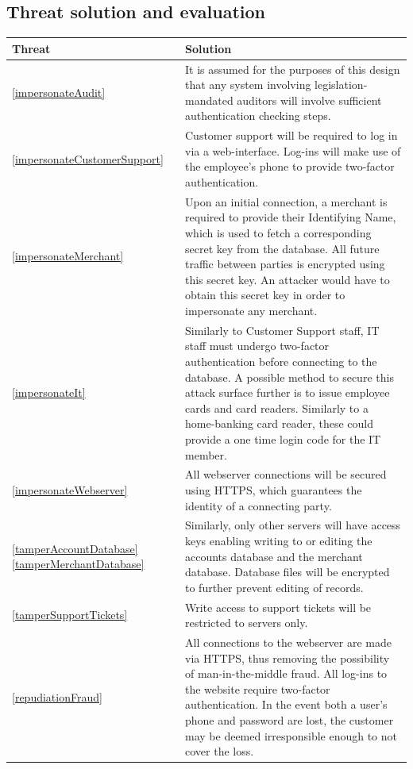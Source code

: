 \subsection{Threat solution and evaluation}

\begin{longtable}{|| p{} | p{} ||}
    \hline
    Threat & Solution \\
    \hline\hline

              \ref{impersonateAudit} & 
        It is assumed for the purposes of this design that any system involving legislation-mandated auditors will involve sufficient authentication checking steps.
    \\ \hline \ref{impersonateCustomerSupport} & 
        Customer support will be required to log in via a web-interface. Log-ins will make use of the employee's phone to provide two-factor authentication.
    \\ \hline \ref{impersonateMerchant} &
        Upon an initial connection, a merchant is required to provide their Identifying Name, which is used to fetch a corresponding secret key from the database. All future traffic between parties is encrypted using this secret key. An attacker would have to obtain this secret key in order to impersonate any merchant.
    \\ \hline \ref{impersonateIt} &
        Similarly to Customer Support staff, IT staff must undergo two-factor authentication before connecting to the database. A possible method to secure this attack surface further is to issue employee cards and card readers. Similarly to a home-banking card reader, these could provide a one time login code for the IT member.
    \\ \hline \ref{impersonateWebserver} &
        All webserver connections will be secured using HTTPS, which guarantees the identity of a connecting party.
    \\ \hline \ref{tamperAccountDatabase} \ref{tamperMerchantDatabase} &
        Similarly, only other servers will have access keys enabling writing to or editing the accounts database and the merchant database. Database files will be encrypted to further prevent editing of records.
    \\ \hline \ref{tamperSupportTickets} &
        Write access to support tickets will be restricted to servers only.
    \\ \hline \ref{repudiationFraud} &
        All connections to the webserver are made via HTTPS, thus removing the possibility of man-in-the-middle fraud. All log-ins to the website require two-factor authentication. In the event both a user's phone and password are lost, the customer may be deemed irresponsible enough to not cover the loss. 

\end{longtable}
